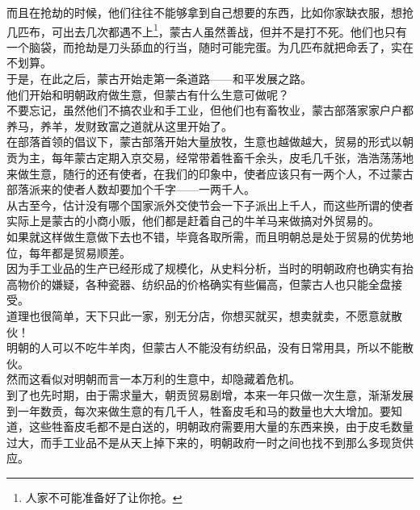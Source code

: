 \begin{multicols}{\theparacolNo}
而且在抢劫的时候，他们往往不能够拿到自己想要的东西，比如你家缺衣服，想抢几匹布，可出去几次都遇不上\footnote{人家不可能准备好了让你抢。}，蒙古人虽然善战，但并不是打不死。他们也只有一个脑袋，而抢劫是刀头舔血的行当，随时可能完蛋。为几匹布就把命丢了，实在不划算。\\

于是，在此之后，蒙古开始走第一条道路——和平发展之路。\\

他们开始和明朝政府做生意，但蒙古有什么生意可做呢？\\

不要忘记，虽然他们不搞农业和手工业，但他们也有畜牧业，蒙古部落家家户户都养马，养羊，发财致富之道就从这里开始了。\\

在部落首领的倡议下，蒙古部落开始大量放牧，生意也越做越大，贸易的形式以朝贡为主，每年蒙古定期入京交易，经常带着牲畜千余头，皮毛几千张，浩浩荡荡地来做生意，随行的还有使者，在我们的印象中，使者应该只有一两个人，不过蒙古部落派来的使者人数却要加个千字——一两千人。\\

从古至今，估计没有哪个国家派外交使节会一下子派出上千人，而这些所谓的使者实际上是蒙古的小商小贩，他们都是赶着自己的牛羊马来做搞对外贸易的。\\

如果就这样做生意做下去也不错，毕竟各取所需，而且明朝总是处于贸易的优势地位，每年都是贸易顺差。\\

因为手工业品的生产已经形成了规模化，从史料分析，当时的明朝政府也确实有抬高物价的嫌疑，各种瓷器、纺织品的价格确实有些偏高，但蒙古人也只能全盘接受。\\

道理也很简单，天下只此一家，别无分店，你想买就买，想卖就卖，不愿意就散伙！\\

明朝的人可以不吃牛羊肉，但蒙古人不能没有纺织品，没有日常用具，所以不能散伙。\\

然而这看似对明朝而言一本万利的生意中，却隐藏着危机。\\

到了也先时期，由于需求量大，朝贡贸易剧增，本来一年只做一次生意，渐渐发展到一年数贡，每次来做生意的有几千人，牲畜皮毛和马的数量也大大增加。要知道，这些牲畜皮毛都不是白送的，明朝政府需要用大量的东西来换，由于皮毛数量过大，而手工业品不是从天上掉下来的，明朝政府一时之间也找不到那么多现货供应。\\


\end{multicols}
